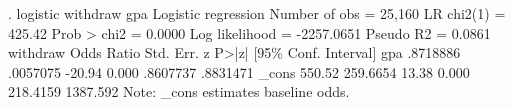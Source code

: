 . logistic withdraw gpa
{\smallskip}
Logistic regression                             Number of obs     =     25,160
                                                LR chi2(1)        =     425.42
                                                Prob > chi2       =     0.0000
Log likelihood = -2257.0651                     Pseudo R2         =     0.0861
{\smallskip}
    withdraw {\VBAR} Odds Ratio   Std. Err.      z    P>|z|     [95\% Conf. Interval]
         gpa {\VBAR}   .8718886   .0057075   -20.94   0.000     .8607737    .8831471
       _cons {\VBAR}     550.52   259.6654    13.38   0.000     218.4159    1387.592
Note: _cons estimates baseline odds.
{\smallskip}
